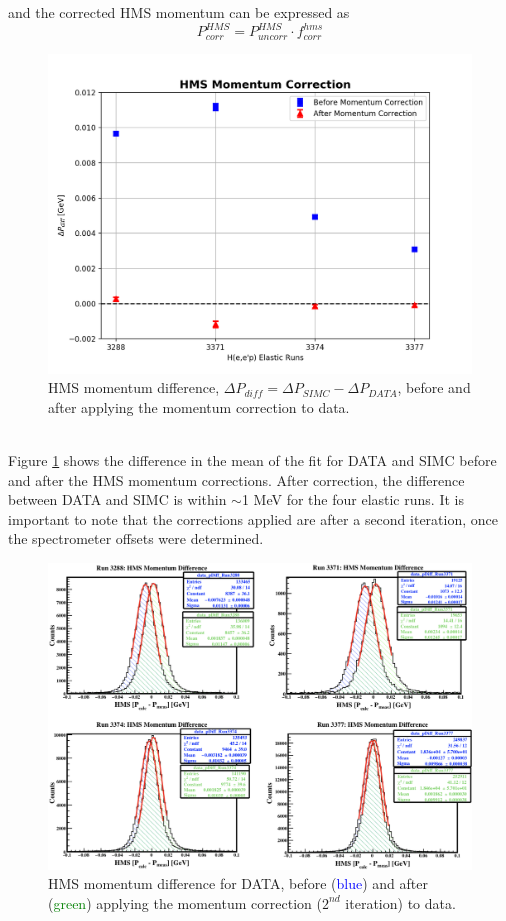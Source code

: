 \documentclass[11pt]{article}
\begin{document}
and the corrected HMS momentum can be expressed as
\begin{equation}
  P^{HMS}_{corr} = P^{HMS}_{uncorr} \cdot f^{hms}_{corr}
  \label{eq:5}
\end{equation}
\begin{figure}[h!]
  \centering
  \includegraphics[scale=0.6]{plots/hms_Pcorr.png}
  \caption{HMS momentum difference, $\Delta P_{diff}=\Delta P_{SIMC} - \Delta P_{DATA}$, before and after applying the momentum correction to data.}
  \label{fig:hms_Pcorr}
\end{figure}\\
Figure \ref{fig:hms_Pcorr} shows the difference in the mean of the fit for DATA and SIMC before and after the HMS momentum
corrections. After correction, the difference between DATA and SIMC is within $\sim$1 MeV for the four elastic runs. It is important to note
that the corrections applied are after a second iteration, once the spectrometer offsets were determined. \\
\begin{figure}[h!]
  \centering
  \includegraphics[scale=0.4]{plots/hms_dataPdiff_compare.png}
  \caption{HMS momentum difference for DATA, before (\textcolor{blue}{blue}) and after (\textcolor{green}{green}) applying the momentum correction ($2^{nd}$ iteration) to data.}
  \label{fig:hms_dataPdiff}
\end{figure}
\end{document}
